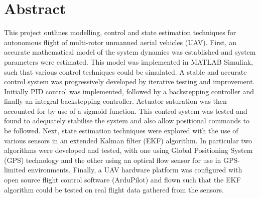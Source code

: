 
\chapter*{Abstract}\label{Abstract}
This project outlines modelling, control and state estimation techniques for autonomous flight of multi-rotor unmanned aerial vehicles (UAV). First, an accurate mathematical model of the system dynamics was established and system parameters were estimated. This model was implemented in MATLAB Simulink, such that various control techniques could be simulated. A stable and accurate control system was progressively developed by iterative testing and improvement. Initially PID control was implemented, followed by a backstepping controller and finally an integral backstepping controller. Actuator saturation was then accounted for by use of a sigmoid function. This control system was tested and found to adequately stabilise the system and also allow positional commands to be followed. Next, state estimation techniques were explored with the use of various sensors in an extended Kalman filter (EKF) algorithm. In particular two algorithms were developed and tested, with one using Global Positioning System (GPS) technology and the other using an optical flow sensor for use in GPS-limited environments. Finally, a UAV hardware platform was configured with open source flight control software (ArduPilot) and flown such that the EKF algorithm could be tested on real flight data gathered from the sensors.
\clearpage


